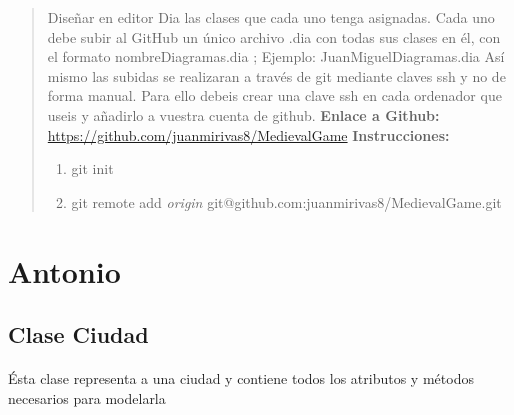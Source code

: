 \documentclass[12pt,a4paper]{article}
\begin{document}
\begin{abstract}
    Diseñar en editor Dia las clases que cada uno tenga asignadas. Cada uno debe subir al GitHub un único archivo .dia con todas sus clases en él,
    con el formato nombreDiagramas.dia ; Ejemplo: JuanMiguelDiagramas.dia 
    \newline
    Así mismo las subidas se realizaran a través de git mediante claves ssh y no de forma manual. Para ello debeis crear una clave ssh en cada ordenador que useis y añadirlo 
    a vuestra cuenta de github.
    \newline
    \textbf{Enlace a Github: }\href{https://github.com/juanmirivas8/MedievalGame}{https://github.com/juanmirivas8/MedievalGame}
    \newline 
    \textbf{Instrucciones: }
    \begin{enumerate}
        \item git init
        \item git remote add \textit{origin} git@github.com:juanmirivas8/MedievalGame.git
    \end{enumerate}
    

\end{abstract}

\tableofcontents
\newpage
\raggedright 

\section{Antonio}
    \subsection{Clase Ciudad}
    \paragraph{}
    Ésta clase representa a una ciudad y contiene todos los atributos y métodos necesarios para modelarla
\end{document}
